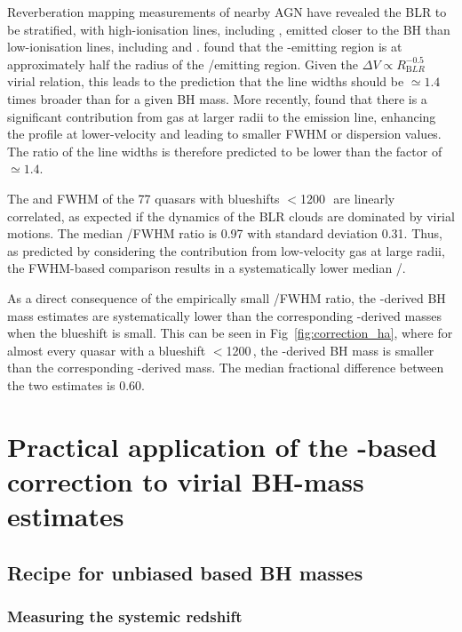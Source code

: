 Reverberation mapping measurements of nearby AGN have revealed the BLR to be stratified, with high-ionisation lines, including , emitted closer to the BH than low-ionisation lines, including \ha and \hb \citep[e.g.][]{onken02}.
\citet{vestergaard06} found that the -emitting region is at approximately half the radius of the \hbns/\ha emitting region.
Given the $\Delta V \propto R_{\mathrm BLR}^{-0.5}$ virial relation, this leads to the prediction that the  line widths should be $\simeq 1.4$ times broader than \ha for a given BH mass. 
More recently, \citet{denney12} found that there is a significant contribution from gas at larger radii to the  emission line, enhancing the profile at lower-velocity and leading to smaller FWHM or dispersion values. 
The ratio of the line widths is therefore predicted to be lower than the factor of $\simeq 1.4$. 

The \ha and  FWHM of the 77 quasars with  blueshifts $<$1200\,\kms\, are linearly correlated, as expected if the dynamics of the BLR clouds are dominated by virial motions. 
The median /\ha FWHM ratio is 0.97 with standard deviation 0.31. 
Thus, as predicted by considering the contribution from low-velocity gas at large radii, the FWHM-based comparison results in a systematically lower median /\hans.

As a direct consequence of the empirically small /\ha FWHM ratio, the -derived BH mass estimates are systematically lower than the corresponding \hans-derived masses when the blueshift is small.
This can be seen in Fig~\ref{fig:correction_ha}, where for almost every quasar with a  blueshift $<$1200\,\kms, the -derived BH mass is smaller than the corresponding \hans-derived mass.
The median fractional difference between the two estimates is 0.60.  

\section{Practical application of the -based correction to virial BH-mass estimates}

\subsection{Recipe for unbiased  based BH masses}
\label{sec:recipe}

\subsubsection{Measuring the systemic redshift}

